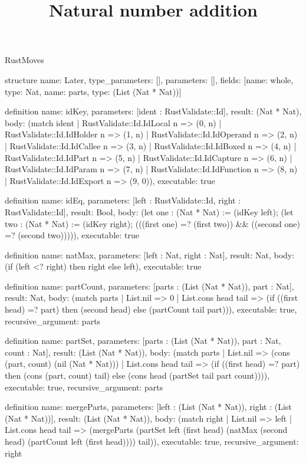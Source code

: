 \begin{lexlean}{RustMoves}
\title{Natural number addition}
\begin{semanticmodule}
structure{
  name: Later,
  type_parameters: [],
  parameters: [],
  fields: [{name: whole, type: Nat}, {name: parts, type: (List (Nat * Nat))}]
}

definition{
  name: idKey,
  parameters: [ident : RustValidate::Id],
  result: (Nat * Nat),
  body: (match ident
    | RustValidate::Id.IdLocal n => (0, n)
    | RustValidate::Id.IdHolder n => (1, n)
    | RustValidate::Id.IdOperand n => (2, n)
    | RustValidate::Id.IdCallee n => (3, n)
    | RustValidate::Id.IdBoxed n => (4, n)
    | RustValidate::Id.IdPart n => (5, n)
    | RustValidate::Id.IdCapture n => (6, n)
    | RustValidate::Id.IdParam n => (7, n)
    | RustValidate::Id.IdFunction n => (8, n)
    | RustValidate::Id.IdExport n => (9, 0)),
  executable: true
}

definition{
  name: idEq,
  parameters: [left : RustValidate::Id, right : RustValidate::Id],
  result: Bool,
  body: (let one : (Nat * Nat) := (idKey left); (let two : (Nat * Nat) := (idKey right); (((first one) =? (first two)) && ((second one) =? (second two))))),
  executable: true
}

definition{
  name: natMax,
  parameters: [left : Nat, right : Nat],
  result: Nat,
  body: (if (left <? right) then right else left),
  executable: true
}

definition{
  name: partCount,
  parameters: [parts : (List (Nat * Nat)), part : Nat],
  result: Nat,
  body: (match parts
    | List.nil => 0
    | List.cons head tail => (if ((first head) =? part) then (second head) else (partCount tail part))),
  executable: true,
  recursive_argument: parts
}

definition{
  name: partSet,
  parameters: [parts : (List (Nat * Nat)), part : Nat, count : Nat],
  result: (List (Nat * Nat)),
  body: (match parts
    | List.nil => (cons (part, count) (nil (Nat * Nat)))
    | List.cons head tail => (if ((first head) =? part) then (cons (part, count) tail) else (cons head (partSet tail part count)))),
  executable: true,
  recursive_argument: parts
}

definition{
  name: mergeParts,
  parameters: [left : (List (Nat * Nat)), right : (List (Nat * Nat))],
  result: (List (Nat * Nat)),
  body: (match right
    | List.nil => left
    | List.cons head tail => (mergeParts (partSet left (first head) (natMax (second head) (partCount left (first head)))) tail)),
  executable: true,
  recursive_argument: right
}


\end{semanticmodule}
\end{lexlean}
